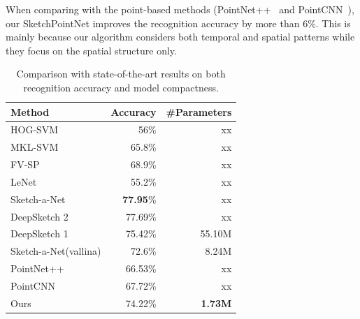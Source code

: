 When comparing with the point-based methods (PointNet++~\cite{qi2017pointnetplusplus} and PointCNN~\cite{1801.07791}), our SketchPointNet improves the recognition accuracy by more than $6\%$.
This is mainly because our algorithm considers both temporal and spatial patterns while they focus on the spatial structure only.



\begin{table}[htbp]
\centering
\caption{Comparison with state-of-the-art results on both recognition accuracy and model compactness.}
\label{tb:acc-size}
\begin{tabular}{l|rr}
    \hline
     Method & Accuracy & \#Parameters\\
    \hline
     HOG-SVM \cite{Eitz2012HowDH}& 56\% & xx \\
     MKL-SVM \cite{LiHSG15} & 65.8\%  & xx \\
     FV-SP \cite{Schneider2014SketchCA} & 68.9\%  & xx\\
     LeNet \cite{LeCun1998GradientbasedLA}& 55.2\%  & xx\\
     \hline
     Sketch-a-Net \cite{Yu2015SketchaNetTB}& \textbf{77.95}\%  & xx\\
     DeepSketch 2 \cite{Dupont2016DeepSketch2D}& 77.69\%  & xx\\
     \hline
     DeepSketch 1 \cite{Seddati2015DeepSketchDC}& 75.42\%  & 55.10M\\
     Sketch-a-Net(vallina) \cite{Yu2015SketchaNetTB}& 72.6\% & 8.24M \\
     \hline
     PointNet++ \cite{qi2017pointnetplusplus}& 66.53\%  & xx\\
     PointCNN \cite{1801.07791}& 67.72\%  & xx\\
     Ours& 74.22\%  & \textbf{1.73M}\\
    \hline
\end{tabular}
\end{table}



